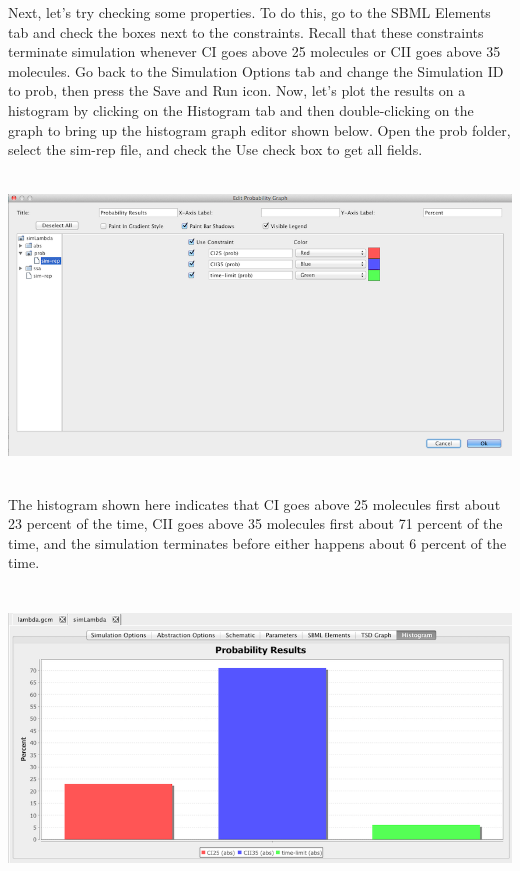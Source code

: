 \documentclass[titlepage,11pt]{article}
\begin{document}
Next, let's try checking some properties.  To do this, go to the SBML Elements tab and check the boxes next to the constraints.  Recall that these constraints terminate simulation whenever CI goes above 25 molecules or CII goes above 35 molecules.  Go back to the Simulation Options tab and change the Simulation ID to prob, then press the Save and Run icon.  Now, let's plot the results on a histogram by clicking on the Histogram tab and then double-clicking on the graph to bring up the histogram graph editor shown below.  Open the prob folder, select the sim-rep file, and check the Use check box to get all fields.  

\begin{center}
\includegraphics[height=80mm]{screenshots/editProbGraph}
\end{center}

The histogram shown here indicates that CI goes above 25 molecules first about 23 percent of the time, CII goes above 35 molecules first about 71 percent of the time, and the simulation terminates before either happens about 6 percent of the time.

\begin{center} 
\includegraphics[height=80mm]{screenshots/probResults}
\end{center}
\end{document}
